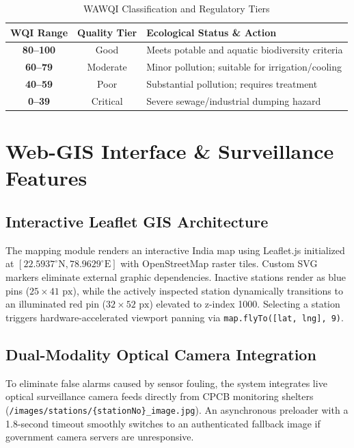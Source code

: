 \documentclass[conference]{IEEEtran}
\begin{document}
\begin{table}[htbp]
\caption{WAWQI Classification and Regulatory Tiers}
\begin{center}
\begin{tabular}{ccl}
\toprule
\textbf{WQI Range} & \textbf{Quality Tier} & \textbf{Ecological Status \& Action} \\
\midrule
\textbf{80--100} & Good & Meets potable and aquatic biodiversity criteria \\
\textbf{60--79} & Moderate & Minor pollution; suitable for irrigation/cooling \\
\textbf{40--59} & Poor & Substantial pollution; requires treatment \\
\textbf{0--39} & Critical & Severe sewage/industrial dumping hazard \\
\bottomrule
\end{tabular}
\end{center}
\end{table}

\section{Web-GIS Interface \& Surveillance Features}
\subsection{Interactive Leaflet GIS Architecture}
The mapping module renders an interactive India map using Leaflet.js initialized at $[22.5937^\circ\text{N}, 78.9629^\circ\text{E}]$ with OpenStreetMap raster tiles. Custom SVG markers eliminate external graphic dependencies. Inactive stations render as blue pins ($25 \times 41\text{ px}$), while the actively inspected station dynamically transitions to an illuminated red pin ($32 \times 52\text{ px}$) elevated to z-index 1000. Selecting a station triggers hardware-accelerated viewport panning via \texttt{map.flyTo([lat, lng], 9)}.

\subsection{Dual-Modality Optical Camera Integration}
To eliminate false alarms caused by sensor fouling, the system integrates live optical surveillance camera feeds directly from CPCB monitoring shelters (\texttt{/images/stations/\{stationNo\}\_image.jpg}). An asynchronous preloader with a 1.8-second timeout smoothly switches to an authenticated fallback image if government camera servers are unresponsive.
\end{document}
